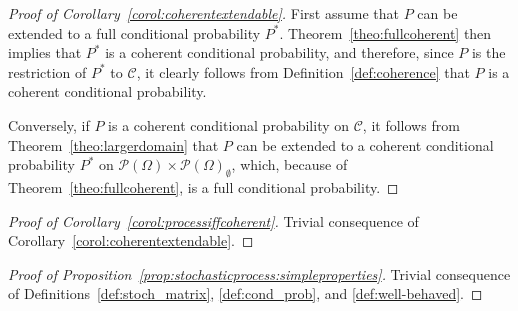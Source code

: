 \documentclass[10pt,a4paper]{paper}
\theoremstyle{definition}
\newcommand{\paths}{\Omega}
\newcommand{\power}{\mathcal{P}(\paths)}
\newcommand{\nonemptypower}{\power_{\emptyset}}
\begin{document}
\begin{proof}[Proof of Corollary~\ref{corol:coherentextendable}]
First assume that $P$ can be extended to a full conditional probability $P^*$. Theorem~\ref{theo:fullcoherent} then implies that $P^*$ is a coherent conditional probability, and therefore, since $P$ is the restriction of $P^*$ to $\mathcal{C}$, it clearly follows from Definition~\ref{def:coherence} that $P$ is a coherent conditional probability.

Conversely, if $P$ is a coherent conditional probability on $\mathcal{C}$, it follows from Theorem~\ref{theo:largerdomain} that $P$ can be extended to a coherent conditional probability $P^*$ on $\power\times\nonemptypower$, which, because of Theorem~\ref{theo:fullcoherent}, is a full conditional probability.
\end{proof}
\begin{proof}[Proof of Corollary~\ref{corol:processiffcoherent}]
Trivial consequence of Corollary~\ref{corol:coherentextendable}.
\end{proof}
\begin{proof}[Proof of Proposition~\ref{prop:stochasticprocess:simpleproperties}]
Trivial consequence of Definitions~\ref{def:stoch_matrix}, \ref{def:cond_prob}, and \ref{def:well-behaved}.
\end{proof}
\end{document}
